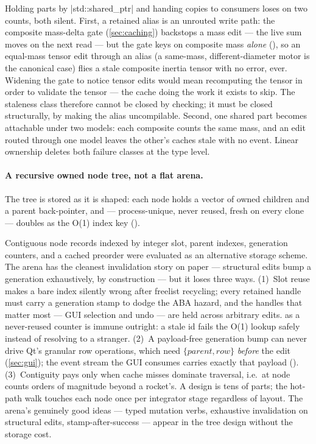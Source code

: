 \begin{rejected}
Holding parts by \cppinline|std::shared_ptr| and handing copies to consumers loses on two
counts, both silent. First, a retained alias is an unrouted write path: the composite
mass-delta gate (\cref{sec:caching}) backstops a mass edit --- the live sum moves on the
next read --- but the gate keys on composite mass \emph{alone}
(), so an equal-mass tensor edit through an alias
(a same-mass, different-diameter motor is the canonical case) flies a stale composite
inertia tensor with no error, ever. Widening the gate to notice tensor edits would mean
recomputing the tensor in order to validate the tensor --- the cache doing the work it
exists to skip. The staleness class therefore cannot be closed by checking; it must be
closed structurally, by making the alias uncompilable. Second, one shared part becomes
attachable under two models: each composite counts the same mass, and an edit routed
through one model leaves the other's caches stale with no event. Linear ownership deletes
both failure classes at the type level.
\end{rejected}

\paragraph{A recursive owned node tree, not a flat arena.}
The tree is stored as it is shaped: each node holds a vector of owned children and a
parent back-pointer, and  --- process-unique, never reused, fresh on every
clone --- doubles as the O(1) index key ().

\begin{rejected}
Contiguous node records indexed by integer slot, parent indexes, generation counters, and
a cached preorder were evaluated as an alternative storage scheme. The arena has the
cleanest invalidation story on paper --- structural edits bump a generation exhaustively,
by construction --- but it loses three ways. (1)~Slot reuse makes a bare index silently
wrong after freelist recycling; every retained handle must carry a generation stamp to
dodge the ABA hazard, and the handles that matter most --- GUI selection and undo ---
are held across arbitrary edits.  as a never-reused counter is immune
outright: a stale id fails the O(1) lookup safely instead of resolving to a stranger.
(2)~A payload-free generation bump can never drive Qt's granular row operations, which
need $\{parent, row\}$ \emph{before} the edit (\cref{sec:gui}); the event stream the GUI
consumes carries exactly that payload ().
(3)~Contiguity pays only when cache misses dominate traversal, i.e.\ at node counts
orders of magnitude beyond a rocket's. A design is tens of parts; the hot-path walk
touches each node once per integrator stage regardless of layout. The arena's genuinely
good ideas --- typed mutation verbs, exhaustive invalidation on structural edits,
stamp-after-success --- appear in the tree design without the storage cost.
\end{rejected}

